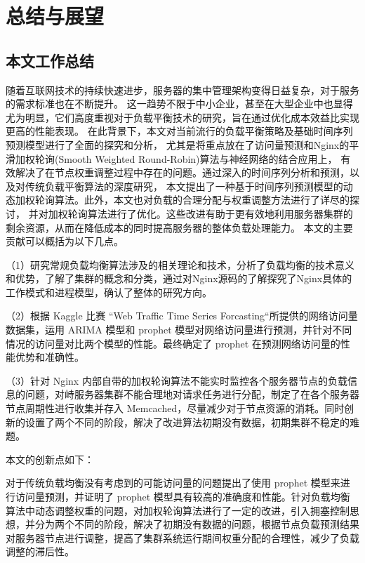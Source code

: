 \chapter{总结与展望}

\section{本文工作总结}

随着互联网技术的持续快速进步，服务器的集中管理架构变得日益复杂，对于服务的需求标准也在不断提升。
这一趋势不限于中小企业，甚至在大型企业中也显得尤为明显，它们高度重视对于负载平衡技术的研究，旨在通过优化成本效益比实现更高的性能表现。
在此背景下，本文对当前流行的负载平衡策略及基础时间序列预测模型进行了全面的探究和分析，
尤其是将重点放在了访问量预测和Nginx的平滑加权轮询(Smooth Weighted Round-Robin)算法与神经网络的结合应用上，
有效解决了在节点权重调整过程中存在的问题。通过深入的时间序列分析和预测，以及对传统负载平衡算法的深度研究，
本文提出了一种基于时间序列预测模型的动态加权轮询算法。此外，本文也对负载的合理分配与权重调整方法进行了详尽的探讨，
并对加权轮询算法进行了优化。这些改进有助于更有效地利用服务器集群的剩余资源，从而在降低成本的同时提高服务器的整体负载处理能力。
本文的主要贡献可以概括为以下几点。

（1）研究常规负载均衡算法涉及的相关理论和技术，分析了负载均衡的技术意义和优势，了解了集群的概念和分类，通过对Nginx源码的了解探究了Nginx具体的工作模式和进程模型，确认了整体的研究方向。

（2）根据 Kaggle 比赛 “Web Traffic Time Series Forcasting“所提供的网络访问量数据集，运用 ARIMA 模型和 prophet 模型对网络访问量进行预测，并针对不同情况的访问量对比两个模型的性能。最终确定了 prophet 在预测网络访问量的性能优势和准确性。

（3）针对 Nginx 内部自带的加权轮询算法不能实时监控各个服务器节点的负载信息的问题，对峙服务器集群不能合理地对请求任务进行分配，制定了在各个服务器节点周期性进行收集并存入 Memcached，尽量减少对于节点资源的消耗。同时创新的设置了两个不同的阶段，解决了改进算法初期没有数据，初期集群不稳定的难题。

本文的创新点如下：

对于传统负载均衡没有考虑到的可能访问量的问题提出了使用 prophet 模型来进行访问量预测，并证明了 prophet 模型具有较高的准确度和性能。针对负载均衡算法中动态调整权重的问题，对加权轮询算法进行了一定的改进，引入拥塞控制思想，并分为两个不同的阶段，解决了初期没有数据的问题，根据节点负载预测结果对服务器节点进行调整，提高了集群系统运行期间权重分配的合理性，减少了负载调整的滞后性。

